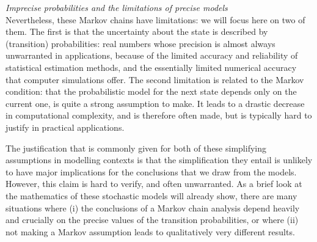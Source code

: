 \documentclass[11pt,dvipsnames,usenames,a4paper]{article}
\begin{document}
\vspace{5pt}
\emph{Imprecise probabilities and the limitations of precise models}\\[5pt]
Nevertheless, these Markov chains have limitations: we will focus here on two of them.
The first is that the uncertainty about the state is described by (transition) probabilities: real numbers whose precision is almost always unwarranted in applications, because of the limited accuracy and reliability of statistical estimation methods, and the essentially limited numerical accuracy that computer simulations offer.
The second limitation is related to the Markov condition: that the probabilistic model for the next state depends only on the current one, is quite a strong assumption to make. 
It leads to a drastic decrease in computational complexity, and is therefore often made, but is typically hard to justify in practical applications.

The justification that is commonly given for both of these simplifying assumptions in modelling contexts is that the simplification they entail is unlikely to have major implications for the conclusions that we draw from the models.
However, this claim is hard to verify, and often unwarranted.
As a brief look at the mathematics of these stochastic models will already show, there are many situations where (i) the conclusions of a Markov chain analysis depend heavily and crucially on the precise values of the transition probabilities, or where (ii) not making a Markov assumption leads to qualitatively very different results.
\end{document}

